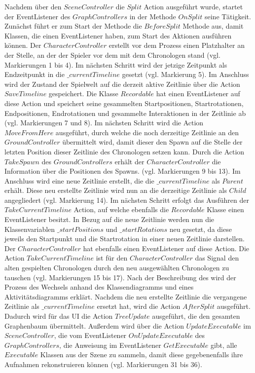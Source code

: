 Nachdem über den $SceneController$ die $Split$ Action ausgeführt wurde, startet der EventListener des $GraphControllers$ in der Methode $OnSplit$ seine Tätigkeit. Zunächst führt er zum Start der Methode die $BeforeSplit$ Methode aus, damit  Klassen, die einen EventListener haben, zum Start des  Aktionen ausführen können. Der $CharacterController$ erstellt vor dem  Prozess einen Platzhalter an der Stelle, an der der Spieler vor dem  mit dem Chronologen stand (vgl. Markierungen 1 bis 4). Im nächsten Schritt wird der jetzige Zeitpunkt als Endzeitpunkt in die $\_currentTimeline$ gesetzt (vgl. Markierung 5). Im Anschluss wird der Zustand der Spielwelt auf die derzeit aktive Zeitlinie über die Action $SaveTimeline$ gespeichert. Die Klasse $Recordable$ hat einen EventListener auf diese Action und speichert seine gesammelten Startpositionen, Startrotationen, Endpositionen, Endrotationen und gesammelte Interaktionen in der Zeitlinie ab (vgl. Markierungen 7 und 8). Im nächsten Schritt wird die Action $MoveFromHere$ ausgeführt, durch welche die noch derzeitige Zeitlinie an den $GroundController$ übermittelt wird, damit dieser den Spawn auf die Stelle der letzten Position dieser Zeitlinie des Chronologen setzen kann. Durch die Action $TakeSpawn$ des $GroundControllers$ erhält der $CharacterController$ die Information über die Positionen des Spawns. (vgl. Markierungen 9 bis 13). Im Anschluss wird eine neue Zeitlinie erstellt, die die $\_currentTimeline$ als $Parent$ erhält. Diese neu erstellte Zeitlinie wird nun an die derzeitige Zeitlinie als $Child$ angegliedert (vgl. Markierung 14).
Im nächsten Schritt erfolgt das Ausführen der $TakeCurrentTimeline$ Action, auf welche ebenfalls die $Recordable$ Klasse einen EventListener besitzt. In Bezug auf die neue Zeitlinie werden nun die Klassenvariablen $\_startPositions$ und $\_startRotations$ neu gesetzt, da diese jeweils den Startpunkt und die Startrotation in einer neuen Zeitlinie darstellen. Der $CharacterController$ hat ebenfalls einen EventListener auf diese Action. Die Action $TakeCurrentTimeline$ ist für den $CharacterController$ das Signal den alten gespielten Chronologen durch den neu ausgewählten Chronologen zu tauschen (vgl. Markierungen 15 bis 17). Nach der Beschreibung des  wird der Prozess des Wechsels anhand des Klassendiagramms und eines Aktivitätsdiagramms erklärt. Nachdem die neu erstellte Zeitlinie die vergangene Zeitlinie als $\_currentTimeline$ ersetzt hat, wird die Action $AfterSplit$ ausgeführt. Dadurch wird für das \ac{UI} die Action $TreeUpdate$ ausgeführt, die den gesamten Graphenbaum übermittelt. Außerdem wird über die Action $UpdateExecutable$ im $SceneController$, die vom EventListener $OnUpdateExecutable$ des $GraphControllers$, die Anweisung im EventListener $GetExecutable$ gibt, alle $Executable$ Klassen aus der Szene zu sammeln, damit diese gegebenenfalls ihre Aufnahmen rekonstruieren können (vgl. Markierungen 31 bis 36).


